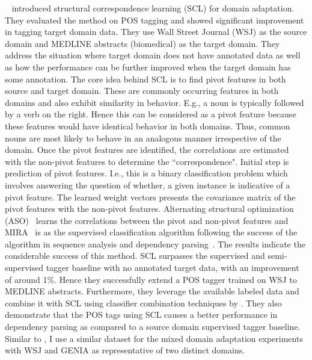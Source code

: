 ~\cite{blitzer:mcdonald:ea:06} introduced structural correspondence learning (SCL) for domain adaptation. They evaluated the method on POS tagging and showed significant improvement in tagging target domain data. They use Wall Street Journal (WSJ) as the source domain and MEDLINE abstracts (biomedical) as the target domain. They address the situation where target domain does not have annotated data as well as how the performance can be further improved when the target domain has some annotation. The core idea behind SCL is to find pivot features in both source and target domain. These are commonly occurring features in both domains and also exhibit similarity in behavior. E.g., a noun is typically followed by a verb on the right. Hence this can be considered as a pivot feature because these features would have identical behavior in both domains. Thus, common nouns are most likely to behave in an analogous manner irrespective of the domain. Once the pivot features are identified, the correlations are estimated with the non-pivot features to determine the ``correspondence". Initial step is prediction of pivot features. I.e., this is a binary classification problem which involves answering the question of whether, a given instance is indicative of a pivot feature. The learned weight vectors presents the covariance matrix of the pivot features with the non-pivot features. Alternating structural optimization (ASO)~\citep{ando2005framework} learns the correlations between the pivot and non-pivot features and MIRA~\citep{crammer2006online} is as the supervised classification algorithm following the success of the algorithm in sequence analysis and dependency parsing~\citep{McDonald:2005:NDP:1220575.1220641,McDonald:2005:OLT:1219840.1219852}. The results indicate the considerable success of this method. SCL surpasses the supervised and semi-supervised tagger baseline with no annotated target data, with an improvement of around 1\%. Hence they successfully extend a POS tagger trained on WSJ to MEDLINE abstracts. Furthermore, they leverage the available labeled data and combine it with SCL using classifier combination techniques by \cite{florian2004statistical}. They also demonstrate that the POS tags using SCL causes a better performance in dependency parsing as compared to a source domain supervised tagger baseline. Similar to \cite{blitzer:mcdonald:ea:06}, I use a similar dataset for the mixed domain adaptation experiments with WSJ and GENIA as representative of two distinct domains. 

